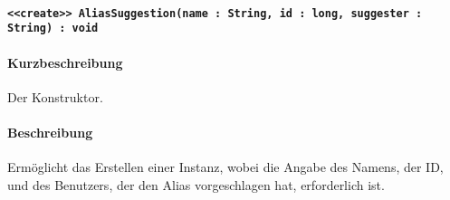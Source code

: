 \paragraph{\texttt{<<create>> AliasSuggestion(name : String, id : long, suggester : String) : void}}%
\paragraph*{Kurzbeschreibung}
Der Konstruktor.
\paragraph*{Beschreibung}
Ermöglicht das Erstellen einer Instanz, wobei die Angabe des Namens, der ID, und des Benutzers, der den Alias vorgeschlagen hat, erforderlich ist.
